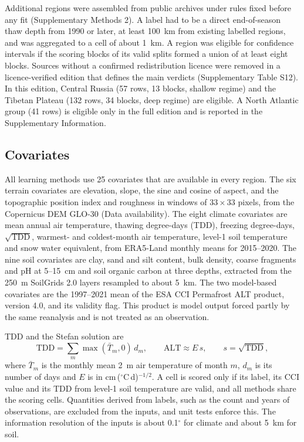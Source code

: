 Additional regions were assembled from public archives under rules fixed before any fit (Supplementary Methods 2). A label had to be a direct end-of-season thaw depth from 1990 or later, at least 100~km from existing labelled regions, and was aggregated to a cell of about 1~km. A region was eligible for confidence intervals if the scoring blocks of its valid splits formed a union of at least eight blocks. Sources without a confirmed redistribution licence were removed in a licence-verified edition that defines the main verdicts (Supplementary Table S12). In this edition, Central Russia (57 rows, 13 blocks, shallow regime) and the Tibetan Plateau (132 rows, 34 blocks, deep regime) are eligible. A North Atlantic group (41 rows) is eligible only in the full edition and is reported in the Supplementary Information.

\subsection{Covariates}\label{sec:m-covariates}

All learning methods use 25 covariates that are available in every region. The six terrain covariates are elevation, slope, the sine and cosine of aspect, and the topographic position index and roughness in windows of $33 \times 33$ pixels, from the Copernicus DEM GLO-30 (Data availability). The eight climate covariates are mean annual air temperature, thawing degree-days (TDD), freezing degree-days, $\sqrt{\mathrm{TDD}}$, warmest- and coldest-month air temperature, level-1 soil temperature and snow water equivalent, from ERA5-Land monthly means for 2015--2020\cite{munozsabater2021_era5_land}. The nine soil covariates are clay, sand and silt content, bulk density, coarse fragments and pH at 5--15~cm and soil organic carbon at three depths, extracted from the 250~m SoilGrids 2.0 layers\cite{Poggio2021} resampled to about 5~km. The two model-based covariates are the 1997--2021 mean of the ESA CCI Permafrost ALT product, version 4.0, and its validity flag\cite{Westermann2024}. This product is model output forced partly by the same reanalysis and is not treated as an observation.

TDD and the Stefan solution\cite{Stefan1891} are
\begin{equation}
\mathrm{TDD} = \sum_{m} \max(\bar{T}_m, 0)\, d_m, \qquad \mathrm{ALT} \approx E\, s, \qquad s = \sqrt{\mathrm{TDD}},
\label{eq:stefan}
\end{equation}
where $\bar{T}_m$ is the monthly mean 2~m air temperature of month $m$, $d_m$ is its number of days and $E$ is in cm\,($^{\circ}$C\,d)$^{-1/2}$. A cell is scored only if its label, its CCI value and its TDD from level-1 soil temperature are valid, and all methods share the scoring cells. Quantities derived from labels, such as the count and years of observations, are excluded from the inputs, and unit tests enforce this. The information resolution of the inputs is about 0.1$^{\circ}$ for climate and about 5~km for soil.

